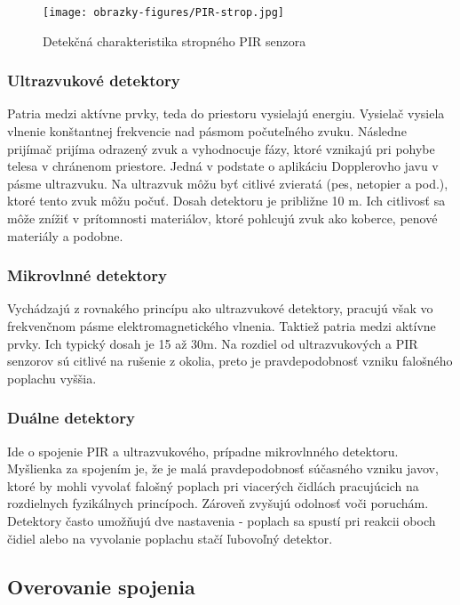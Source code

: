 \begin{figure}[!ht]
    \centering
    \texttt{[image: obrazky-figures/PIR-strop.jpg]}
    \caption{Detekčná charakteristika stropného PIR senzora\cite{PIR-strop}}
    \label{fig:pir-strop}
\end{figure}

\subsubsection{Ultrazvukové detektory}

Patria medzi aktívne prvky, teda do priestoru vysielajú energiu. Vysielač vysiela vlnenie konštantnej frekvencie nad pásmom počuteľného zvuku. Následne prijímač prijíma odrazený zvuk a vyhodnocuje fázy, ktoré vznikajú pri pohybe telesa v chránenom priestore. Jedná v podstate o aplikáciu Dopplerovho javu v pásme ultrazvuku. Na ultrazvuk môžu byť citlivé zvieratá (pes, netopier a pod.), ktoré tento zvuk môžu počuť. Dosah detektoru je približne 10 m. Ich citlivosť sa môže znížiť v prítomnosti materiálov, ktoré pohlcujú zvuk ako koberce, penové materiály a podobne.\cite{Krecek}

\subsubsection{Mikrovlnné detektory}

Vychádzajú z rovnakého princípu ako ultrazvukové detektory, pracujú však vo frekvenčnom pásme elektromagnetického vlnenia. Taktiež patria medzi aktívne prvky. Ich typický dosah je 15 až 30m. Na rozdiel od ultrazvukových a PIR senzorov sú citlivé na rušenie z okolia, preto je pravdepodobnosť vzniku falošného poplachu vyššia.\cite{velas_ezs}

\subsubsection{Duálne detektory}

Ide o spojenie PIR a ultrazvukového, prípadne mikrovlnného detektoru. Myšlienka za spojením je, že je malá pravdepodobnosť súčasného vzniku javov, ktoré by mohli vyvolať falošný poplach pri viacerých čidlách pracujúcich na rozdielnych fyzikálnych princípoch. Zároveň zvyšujú odolnosť voči poruchám. Detektory často umožňujú dve nastavenia - poplach sa spustí pri reakcii oboch čidiel alebo na vyvolanie poplachu stačí ľubovoľný detektor.\cite{velas_ezs}

\subsection{Overovanie spojenia}

